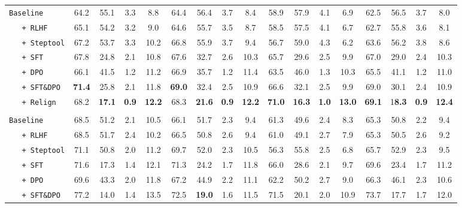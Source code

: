 \begin{table}[!ht]
\begin{adjustbox}{width=0.98\textwidth}
\begin{tabular}{lcccccccccccccccc}
        \midrule
        \texttt{Baseline} & 64.2 & 55.1 & 3.3 & 8.8 & 64.4 & 56.4 & 3.7 & 8.4 & 58.9 & 57.9 & 4.1 & 6.9 & 62.5 & 56.5 & 3.7 & 8.0 \\
        \texttt{\ \ \  + RLHF}  & 65.1 & 54.2 & 3.2 & 9.0 & 64.6 & 55.7 & 3.5 & 8.7 & 58.5 & 57.5 & 4.1 & 6.7 & 62.7 & 55.8 & 3.6 & 8.1 \\
         \texttt{\ \ \  + Steptool} &67.2 & 53.7 & 3.3 & 10.2 &
         66.8 & 55.9 & 3.7 & 9.4 &
         56.7 & 59.0 & 4.3 &6.2 & 63.6 & 56.2 & 3.8 & 8.6
         \\
         \hdashline
        \texttt{\ \ \  +  SFT}   & 67.8 & 24.8 & 2.1 & 10.8 & 67.6 & 32.7 & 2.6 & 10.3 & 65.7 & 29.6 & 2.5 & 9.9 & 67.0 & 29.0 & 2.4 & 10.3 \\
        \texttt{\ \ \  +  DPO}  & 66.1 & 41.5 & 1.2 & 11.2 & 66.9 & 35.7 & 1.2 & 11.4 & 63.5 & 46.0 & 1.3 & 10.3 & 65.5 & 41.1 & 1.2 & 11.0   \\
        \texttt{\ \ \  +  SFT\&DPO}  & \textbf{71.4} & 25.8 & 2.1 & 11.8 & \textbf{69.0} & 32.4 & 2.5 & 10.9 & 66.6 & 32.1 & 2.5 & 9.9 & 69.0 & 30.1 & 2.4 & 10.9 \\
        \texttt{\ \ \  + Relign}  & 68.2 & \textbf{17.1} & \textbf{0.9} & \textbf{12.2} & 68.3 & \textbf{21.6} & \textbf{0.9} & \textbf{12.2} & \textbf{71.0} & \textbf{16.3} & \textbf{1.0} & \textbf{13.0} & \textbf{69.1} & 1\textbf{8.3} & \textbf{0.9} & \textbf{12.4}   \\
        \midrule
        \rowcolor{gray!8}\multicolumn{17}{c}{\textit{Llama3.1 (8B)}~\citep{dubey2024llama}}\\
        \midrule
        \texttt{Baseline}     & 68.5 & 51.2 & 2.1 & 10.5 & 66.1 & 51.7 & 2.3 & 9.4 & 61.3 & 49.6 & 2.4 & 8.3 & 65.3 & 50.8 & 2.2 & 9.4 \\
        \texttt{\ \ \  + RLHF}     & 68.5 & 51.7 & 2.4 & 10.2 & 66.5 & 50.8 & 2.6 & 9.4 & 61.0 & 49.1 & 2.7 & 7.9 & 65.3 & 50.5 & 2.6 & 9.2 \\
        \texttt{\ \ \  + Steptool}    & 71.1 & 50.8 & 2.0 & 11.2 & 69.7 & 52.0 & 2.3 & 10.5 & 56.3 & 55.8 & 2.5 & 6.8 & 65.7 & 52.9 & 2.3 & 9.5 \\
        \hdashline
        \texttt{\ \ \  +  SFT}  & 71.6 & 17.3 & 1.4 & 12.1 & 71.3 & 24.2 & 1.7 & 11.8 & 66.0 & 28.6 & 2.1 & 9.7 & 69.6 & 23.4 & 1.7 & 11.2 \\
        \texttt{\ \ \  +  DPO} & 69.6 & 43.3 & 2.0 & 11.8 & 67.2 & 44.9 & 2.2 & 11.1 & 62.2 & 50.2 & 2.7 & 9.0 & 66.3 & 46.1 & 2.3 & 10.6   \\
        \texttt{\ \ \  +  SFT\&DPO}  & 77.2 & 14.0 & 1.4 & 13.5 & 72.5 & \textbf{19.0} & 1.6 & 11.5 & 71.5 & 20.1 & 2.0 & 10.9 & 73.7 & 17.7 & 1.7 & 12.0 \\

\end{tabular}
\end{adjustbox}
\end{table}
